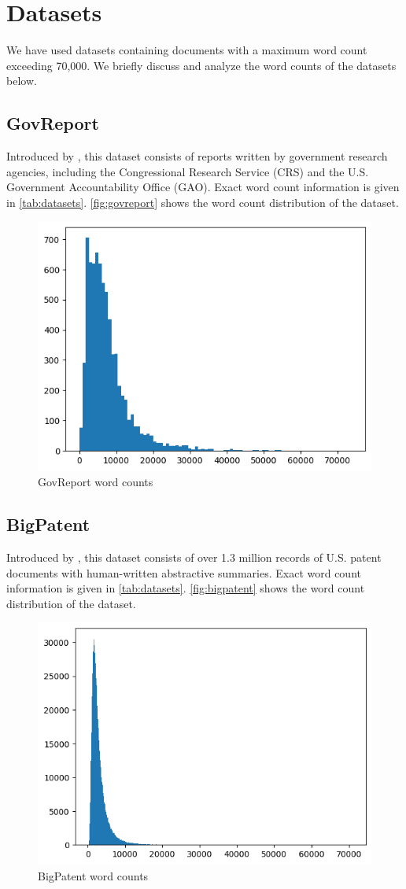 \section{Datasets}
	\label{sec:datasets}

	We have used datasets containing documents with a maximum word count exceeding 70,000.
	We briefly discuss and analyze the word counts of the datasets below.


\subsection*{GovReport}

	Introduced by \citet{huang-etal-2021-efficient}, this dataset consists of reports written
	by government research agencies, including the Congressional Research Service (CRS) and
	the U.S. Government Accountability Office (GAO).
	Exact word count information is given in \autoref{tab:datasets}.
	\autoref{fig:govreport} shows the word count distribution of the dataset.

	\begin{figure}[!ht]
		\centering
		\includegraphics[width=.48\textwidth]{Images/govreport-wordcount.png}
		\caption{GovReport word counts}
		\label{fig:govreport}
	\end{figure}


\subsection*{BigPatent}

	Introduced by \citet{sharma-etal-2019-bigpatent}, this dataset consists of over 1.3 million
	records of U.S. patent documents with human-written abstractive summaries.
	Exact word count information is given in \autoref{tab:datasets}.
	\autoref{fig:bigpatent} shows the word count distribution of the dataset.

	\begin{figure}[!ht]
		\centering
		\includegraphics[width=.48\textwidth]{Images/bigpatent-wordcount.png}
		\caption{BigPatent word counts}
		\label{fig:bigpatent}
	\end{figure}


